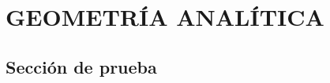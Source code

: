 \chapter[GEOMETRÍA ANALÍTICA]{GEOMETRÍA ANALÍTICA}%
\startcontents
\printchaptertableofcontents

\lipsum[1-3]
\section{Sección de prueba}
\lipsum[1-5]